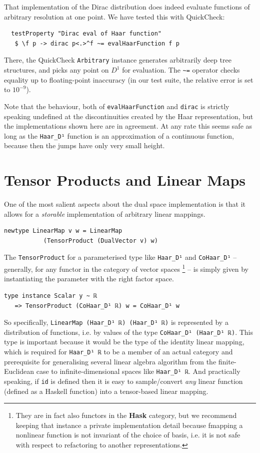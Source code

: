 \documentclass[sigplan,screen]{acmart}
\theoremstyle{acmplain}
\theoremstyle{acmdefinition}
\begin{document}
That implementation of the Dirac distribution does indeed evaluate functions of arbitrary resolution at one point. We have tested this with QuickCheck:
\begin{lstlisting}
  testProperty "Dirac eval of Haar function"
   $ \f p -> dirac p<.>^f ~= evalHaarFunction f p
\end{lstlisting}
There, the QuickCheck \lstinline`Arbitrary` instance generates arbitrarily deep tree structures, and picks any point on $D^1$ for evaluation.
The \lstinline`~=` operator checks equality up to floating-point inaccuracy (in our test suite, the relative error  is set to $10^{-9}$).

Note that the behaviour, both of \verb`evalHaarFunction` and \verb`dirac` is strictly speaking undefined at the discontinuities created by the Haar representation, but the implementations shown here are in agreement. At any rate this seems safe as long as the \verb`Haar_D¹` function is an approximation of a continuous function, because then the jumps have only very small height.

\section{Tensor Products and Linear Maps}

One of the most salient aspects about the dual space implementation is that it allows for a \emph{storable} implementation of arbitrary linear mappings.
\begin{lstlisting}
newtype LinearMap v w = LinearMap
           (TensorProduct (DualVector v) w)
\end{lstlisting}
The \lstinline`TensorProduct` for a parameterised type like \lstinline`Haar_D¹` and \lstinline`CoHaar_D¹` -- generally, for any functor in the category of vector spaces%
\footnote{They are in fact also functors in the \textbf{Hask} category, but we recommend keeping that instance a private implementation detail because fmapping a nonlinear function is not invariant of the choice of basis, i.e. it is not safe with respect to refactoring to another representations.
} -- is simply given by instantiating the parameter with the right factor space.
\begin{lstlisting}
type instance Scalar y ~ ℝ
   => TensorProduct (CoHaar_D¹ ℝ) w = CoHaar_D¹ w
\end{lstlisting}
So specifically, \lstinline`LinearMap (Haar_D¹ ℝ) (Haar_D¹ ℝ)` is represented by a distribution of functions, i.e. by values of the type \lstinline`CoHaar_D¹ (Haar_D¹ ℝ)`.
This type is important because it would be the type of the identity linear mapping, which is required for \lstinline`Haar_D¹ ℝ` to be a member of an actual category and prerequisite for generalising several linear algebra algorithm from the finite-Euclidean case to infinite-dimensional spaces like \lstinline`Haar_D¹ ℝ`.
And practically speaking, if \verb`id` is defined then it is easy to sample/convert \emph{any} linear function (defined as a Haskell function) into a tensor-based linear mapping.
\end{document}
